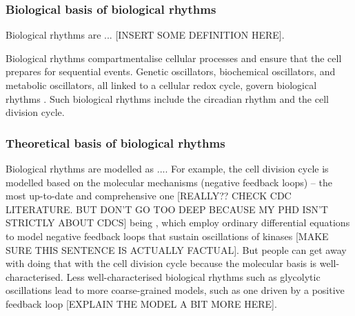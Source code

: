 \subsubsection{Biological basis of biological rhythms}
\label{subsubsec:intro-ymc-biological_rhythms-biological_basis}


Biological rhythms are ... [INSERT SOME DEFINITION HERE].

Biological rhythms compartmentalise cellular processes and ensure that the cell prepares for sequential events.
Genetic oscillators, biochemical oscillators, and metabolic oscillators, all linked to a cellular redox cycle, govern biological rhythms \citep{mellorMolecularBasisMetabolic2016}.
Such biological rhythms include the circadian rhythm and the cell division cycle.

\subsubsection{Theoretical basis of biological rhythms}
\label{subsubsec:intro-ymc-biological_rhythms-theoretical_basis}

Biological rhythms are modelled as ....
For example, the cell division cycle is modelled based on the molecular mechanisms (negative feedback loops) -- the most up-to-date and comprehensive one [REALLY?? CHECK CDC LITERATURE.  BUT DON'T GO TOO DEEP BECAUSE MY PHD ISN'T STRICTLY ABOUT CDCS] being \textcite{novakMitoticKinaseOscillation2022}, which employ ordinary differential equations to model negative feedback loops that sustain oscillations of kinases [MAKE SURE THIS SENTENCE IS ACTUALLY FACTUAL].
But people can get away with doing that with the cell division cycle because the molecular basis is well-characterised.
Less well-characterised biological rhythms such as glycolytic oscillations lead to more coarse-grained models, such as one driven by a positive feedback loop \parencite{goldbeterMultisynchronizationOtherPatterns} [EXPLAIN THE MODEL A BIT MORE HERE]. %

